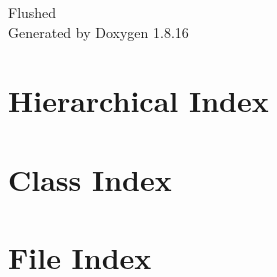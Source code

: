 \let\mypdfximage\pdfximage\def\pdfximage{\immediate\mypdfximage}\documentclass[twoside]{book}
\newcommand{\+}{\discretionary{\mbox{\scriptsize$\hookleftarrow$}}{}{}}
\newcommand{\clearemptydoublepage}{%
  \newpage{\pagestyle{empty}\cleardoublepage}%
}
\begin{document}
\hypersetup{pageanchor=false,
             bookmarksnumbered=true,
             pdfencoding=unicode
            }
\begin{titlepage}
\vspace*{7cm}
\begin{center}%
{\Large Flushed }\\
\vspace*{1cm}
{\large Generated by Doxygen 1.8.16}\\
\end{center}
\end{titlepage}
\clearemptydoublepage
{}
\tableofcontents
\clearemptydoublepage
{}
\hypersetup{pageanchor=true}

\chapter{Hierarchical Index}

\chapter{Class Index}

\chapter{File Index}

\end{document}
